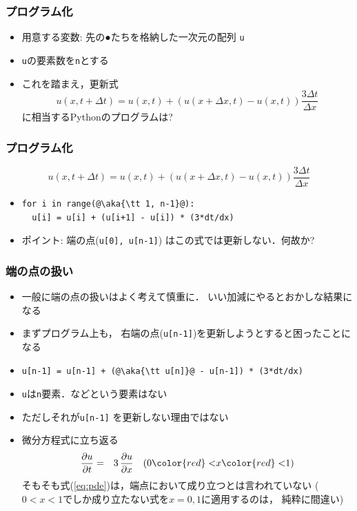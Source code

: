 \documentclass[12pt,dvipdfmx]{beamer}
\newcommand{\aka}[1]{{\color{red}#1}}
\begin{document}
\begin{frame}
\frametitle{プログラム化}
\begin{itemize}
\item 用意する変数: 先の●たちを格納した一次元の配列 {\tt u}
\item {\tt u}の要素数を{\tt n}とする

\begin{center}
\def\svgwidth{0.8\textwidth}

\end{center}

\item これを踏まえ，更新式
\[ u(x,t+\Delta t) =
u(x,t) + (u(x+\Delta x, t) - u(x, t)) \frac{3\Delta t}{\Delta x} \]
に相当するPythonのプログラムは?
\end{itemize}
\end{frame}

\begin{frame}[fragile]
\frametitle{プログラム化}
\[ u(x,t+\Delta t) =
u(x,t) + (u(x+\Delta x, t) - u(x, t)) \frac{3\Delta t}{\Delta x} \]
\begin{itemize}
\item []
\begin{lstlisting}
for i in range(@\aka{\tt 1, n-1}@):
  u[i] = u[i] + (u[i+1] - u[i]) * (3*dt/dx)
\end{lstlisting}
\item ポイント: \aka{端の点({\tt u[0], u[n-1]})
はこの式では更新しない}．何故か?
\end{itemize}
\end{frame}

\begin{frame}[fragile]
\frametitle{端の点の扱い}
\begin{itemize}
\item 一般に端の点の扱いはよく考えて慎重に．
いい加減にやるとおかしな結果になる

\item まずプログラム上も，
右端の点({\tt u[n-1]})を更新しようとすると困ったことになる
\item []
\begin{lstlisting}[basicstyle=\ttfamily\footnotesize]
u[n-1] = u[n-1] + (@\aka{\tt u[n]}@ - u[n-1]) * (3*dt/dx)
\end{lstlisting}
\item {\tt u}は{\tt n}要素．\aka{{\tt u[n]}などという要素はない}

\item ただしそれが{\tt u[n-1]}
を更新しない\aka{理由}ではない

\item 微分方程式に立ち返る
\begin{eqnarray}
\frac{\partial u}{\partial t} & = & 3\, \frac{\partial u}{\partial x} \quad
(0 \aka{<} x \aka{<} 1) \label{eq:pde}
\end{eqnarray}
そもそも式(\ref{eq:pde})は，端点において成り立つとは言われていない
($0 < x < 1$でしか成り立たない式を$x = 0, 1$に適用するのは，
純粋に間違い)
\end{itemize}
\end{frame}
\end{document}

